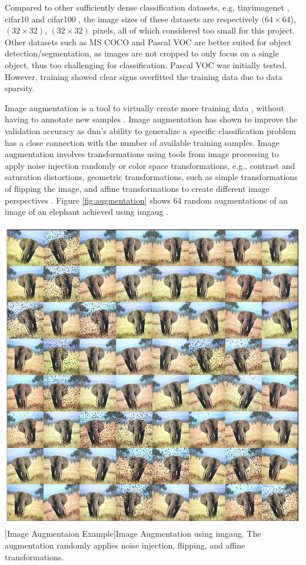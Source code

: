 \begin{enumdescript}
\begin{enumdescript}
		Compared to other sufficiently dense classification datasets, e.g, \gls{tinyimagenet} \cite{li_cs231n:_2018}, \gls{cifar10} and \gls{cifar100} \cite{krizhevsky_cifar-10_nodate}, the image sizes of these datasets are respectively $(64\times 64$), $(32\times 32)$, $(32\times 32)$ pixels, all of which considered too small for this project. Other datasets such as MS COCO and Pascal VOC are better suited for object detection/segmentation, as images are not cropped to only focus on a single object, thus too challenging for classification. Pascal VOC was initially tested. However, training showed clear signs overfitted the training data due to data sparsity. 
		
		\item[Image Augmentation] Image augmentation is a tool to virtually create more training data \cite{perez_effectiveness_2017}, without having to annotate new samples \cite{goodfellow_deep_2016}. Image augmentation has shown to improve the validation accuracy as \gls{dnn}'s ability to generalize a specific classification problem has a close connection with the number of available training samples.
		Image augmentation involves transformations using tools from image processing to apply noise injection randomly or color space transformations, e.g., contrast and saturation distortions, geometric transformations, such as simple transformations of flipping the image, and affine transformations to create different image perspectives \cite{shorten_survey_2019}. Figure \ref{fig:augmentation} shows 64 random augmentations of an image of an elephant achieved using \gls{imgaug} \cite{jung_imgaug:_nodate}.  
		
		\begin{minipage}[t]{\linewidth}
			\centering
			\includegraphics[width=.7\linewidth]{figures/augmentation/augmentation_high_resolution.png}
			[Image Augmentaion Example]{Image Augmentation using \gls{imgaug}. The augmentation randomly applies noise injection, flipping, and affine transformations.}
			\label{fig:augmentation}
		\end{minipage}
		

\end{enumdescript}
\end{enumdescript}
